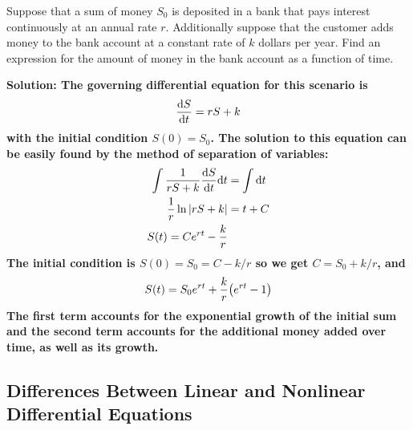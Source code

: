 \begin{example}
    Suppose that a sum of money $S_0$ is deposited in a bank that pays interest continuously at an annual rate $r$. Additionally suppose that the customer adds money to the bank account at a constant rate of $k$ dollars per year. Find an expression for the amount of money in the bank account as a function of time. \par
    \bf{Solution:} The governing differential equation for this scenario is 
    \[ \dv{S}{t} = rS + k \]
    with the initial condition $S(0) = S_0$. The solution to this equation can be easily found by the method of separation of variables:
    \begin{align*}
        \int \frac{1}{rS+k}\dv{S}{t}\dd t &= \int \dd t \\
        \frac{1}{r}\ln \abs{rS+k} &= t + C \\
        S(t) = Ce^{rt}-\frac{k}{r}
    \end{align*}
    The initial condition is $S(0) = S_0 = C-k/r$ so we get $C = S_0 + k/r$, and
    \[ S(t) = S_0e^{rt} + \frac{k}{r}\pqty{e^{rt}-1}\]
    The first term accounts for the exponential growth of the initial sum and the second term accounts for the additional money added over time, as well as its growth.
\end{example}
\subsection{Differences Between Linear and Nonlinear Differential Equations}
